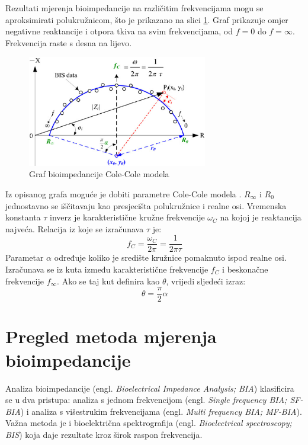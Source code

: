 \documentclass[../diplomski_rad.tex]{subfiles}
\begin{document}
Rezultati mjerenja bioimpedancije na različitim frekvencijama mogu se aproksimirati polukružnicom,  
što je prikazano na slici \ref{slk:cole_graf}. 
Graf prikazuje omjer negativne reaktancije i otpora tkiva na svim frekvencijama, 
od $f=0$ do $f=\infty$. Frekvencija raste s desna na lijevo. 
\begin{figure}[htb]
    \centering
    \includegraphics[width=0.7\textwidth]{Figures/cole_plot.png} 
    \caption{Graf bioimpedancije Cole-Cole modela \cite{Yang_2013}}
    \label{slk:cole_graf}
\end{figure}
Iz opisanog grafa moguće je dobiti parametre Cole-Cole modela \cite{Yang_2013}.
$R_{\infty}$ i $R_{0}$ jednostavno se iščitavaju kao presjecišta polukružnice i realne osi.
Vremenska konstanta $\tau$ inverz je karakteristične kružne frekvencije $\omega_{C}$ na kojoj je reaktancija najveća.
Relacija iz koje se izračunava $\tau$ je:
\begin{equation}
    \label{jed:cole}
    f_{C} = \frac{\omega_{C}}{2\pi} = \frac{1}{2\pi\tau} 
\end{equation} 
Parametar $\alpha$ određuje koliko je središte kružnice pomaknuto ispod realne osi. 
Izračunava se iz kuta između karakteristične frekvencije $f_{C}$ i beskonačne frekvencije $f_{\infty}$. 
Ako se taj kut definira kao $\theta$, vrijedi sljedeći izraz:
\begin{equation}
    \label{jed:cole}
    \theta = \frac{\pi}{2}\alpha 
\end{equation} 

\section{Pregled metoda mjerenja bioimpedancije}
Analiza bioimpedancije (engl. \textit{Bioelectrical Impedance Analysis; BIA}) klasificira se u dva pristupa: 
analiza s jednom frekvencijom (engl. \textit{Single frequency BIA; SF-BIA}) 
i analiza s višestrukim frekvencijama (engl. \textit{Multi frequency BIA; MF-BIA}).
Važna metoda je i bioelektrična spektrografija (engl. \textit{Bioelectrical spectroscopy; BIS}) 
koja daje rezultate kroz širok raspon frekvencija. 
\end{document}
